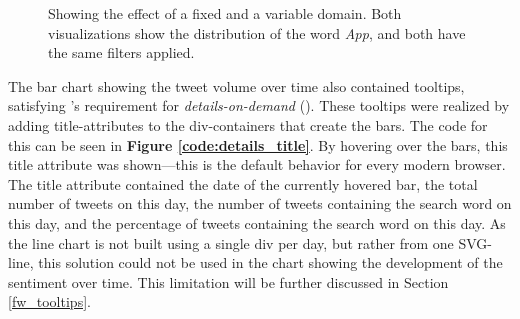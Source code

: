 \begin{figure}[h!tb]
    \caption{Showing the effect of a fixed and a variable domain. Both visualizations show the distribution of the word \emph{App}, and both have the same filters applied.}
    \label{fig:variableVsFixedDomain}
\end{figure}

The bar chart showing the tweet volume over time also contained tooltips, satisfying \citeauthor{shneidermanEyesHaveIt1996}'s requirement for \emph{details-on-demand} (\cite{shneidermanEyesHaveIt1996}). These tooltips were realized by adding title-attributes to the div-containers that create the bars. The code for this can be seen in \textbf{Figure \ref{code:details_title}}. By hovering over the bars, this title attribute was shown---this is the default behavior for every modern browser. The title attribute contained the date of the currently hovered bar, the total number of tweets on this day, the number of tweets containing the search word on this day, and the percentage of tweets containing the search word on this day. As the line chart is not built using a single div per day, but rather from one SVG-line, this solution could not be used in the chart showing the development of the sentiment over time. This limitation will be further discussed in Section \ref{fw_tooltips}.

